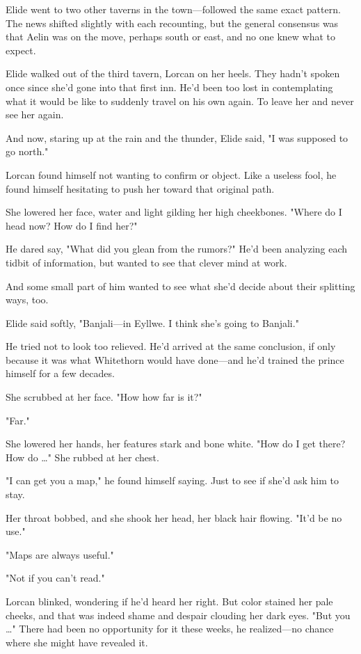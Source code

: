 Elide went to two other taverns in the town---followed the same exact pattern. The news shifted slightly with each recounting, but the general consensus was that Aelin was on the move, perhaps south or east, and no one knew what to expect.

Elide walked out of the third tavern, Lorcan on her heels. They hadn't spoken once since she'd gone into that first inn. He'd been too lost in contemplating what it would be like to suddenly travel on his own again. To leave her  and never see her again.

And now, staring up at the rain and the thunder, Elide said, "I was supposed to go north."

Lorcan found himself not wanting to confirm or object. Like a useless fool, he found himself  hesitating to push her toward that original path.

She lowered her face, water and light gilding her high cheekbones. "Where do I head now? How do I find her?"

He dared say, "What did you glean from the rumors?" He'd been analyzing each tidbit of information, but wanted to see that clever mind at work.

And some small part of him wanted to see what she'd decide about their splitting ways, too.

Elide said softly, "Banjali---in Eyllwe. I think she's going to Banjali."

He tried not to look too relieved. He'd arrived at the same conclusion, if only because it was what Whitethorn would have done---and he'd trained the prince himself for a few decades.

She scrubbed at her face. "How  how far is it?"

"Far."

She lowered her hands, her features stark and bone white. "How do I get there? How do \ldots" She rubbed at her chest.

"I can get you a map," he found himself saying. Just to see if she'd ask him to stay.

Her throat bobbed, and she shook her head, her black hair flowing. "It'd be no use."

"Maps are always useful."

"Not if you can't read."

Lorcan blinked, wondering if he'd heard her right. But color stained her pale cheeks, and that was indeed shame and despair clouding her dark eyes. "But you \ldots" There had been no opportunity for it these weeks, he realized---no chance where she might have revealed it.

